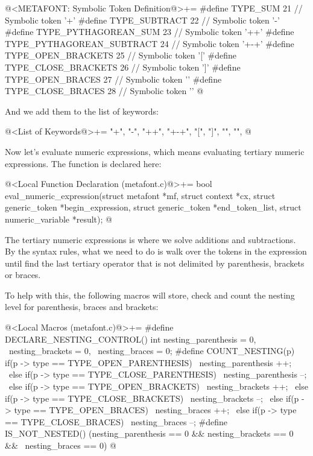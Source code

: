 \iniciocodigo
@<METAFONT: Symbolic Token Definition@>+=
#define TYPE_SUM                   21 // Symbolic token '+'
#define TYPE_SUBTRACT              22 // Symbolic token '-'
#define TYPE_PYTHAGOREAN_SUM       23 // Symbolic token '++'
#define TYPE_PYTHAGOREAN_SUBTRACT  24 // Symbolic token '+-+'
#define TYPE_OPEN_BRACKETS         25 // Symbolic token '['
#define TYPE_CLOSE_BRACKETS        26 // Symbolic token ']'
#define TYPE_OPEN_BRACES           27 // Symbolic token '{'
#define TYPE_CLOSE_BRACES          28 // Symbolic token '}'
@
\fimcodigo

And we add them to the list of keywords:

\iniciocodigo
@<List of Keywords@>+=
"+", "-", "++", "+-+", "[", "]", "{", "}",
@
\fimcodigo

Now let's evaluate numeric expressions, which means evaluating
tertiary numeric expressions. The function is declared here:

\iniciocodigo
@<Local Function Declaration (metafont.c)@>+=
bool eval_numeric_expression(struct metafont *mf, struct context *cx,
                             struct generic_token *begin_expression,
                             struct generic_token *end_token_list,
                             struct numeric_variable *result);
@
\fimcodigo

The tertiary numeric expressions is where we solve additions and
subtractions. By the syntax rules, what we need to do is walk over the
tokens in the expression until find the last tertiary operator that is
not delimited by parenthesis, brackets or braces.

To help with this, the following macros will store, check and count
the nesting level for parenthesis, braces and brackets:

\iniciocodigo
@<Local Macros (metafont.c)@>+=
#define DECLARE_NESTING_CONTROL() int nesting_parenthesis = 0, \
                                      nesting_brackets = 0, \
                                      nesting_braces = 0;
#define COUNT_NESTING(p) if(p -> type == TYPE_OPEN_PARENTHESIS)           \
                               nesting_parenthesis ++;                    \
                             else if(p -> type == TYPE_CLOSE_PARENTHESIS) \
                               nesting_parenthesis --;                    \
                             else if(p -> type == TYPE_OPEN_BRACKETS)     \
                               nesting_brackets ++;                       \
                             else if(p -> type == TYPE_CLOSE_BRACKETS)    \
                               nesting_brackets --;                       \
                             else if(p -> type == TYPE_OPEN_BRACES)       \
                               nesting_braces ++;                         \
                             else if(p -> type == TYPE_CLOSE_BRACES)      \
                               nesting_braces --;
#define IS_NOT_NESTED() (nesting_parenthesis == 0 && nesting_brackets == 0 && \
                         nesting_braces == 0)
@
\fimcodigo


